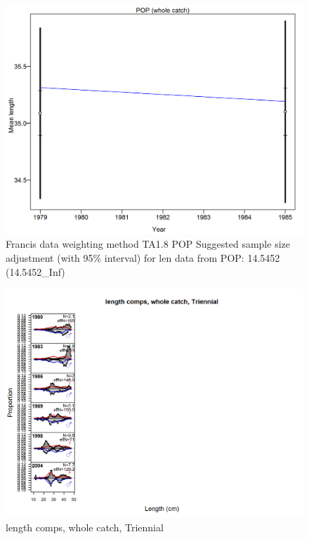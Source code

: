 \documentclass[12pt,]{article}
\begin{document}
\begin{figure}
\centering
\includegraphics{./r4ss/plots_mod1/comp_lenfit_data_weighting_TA1.8_POP.png}
\caption{Francis data weighting method TA1.8 POP Suggested sample size
adjustment (with 95\% interval) for len data from POP: 14.5452
(14.5452\_Inf) \label{fig:mod1_17_comp_lenfit_data_weighting_TA1.8_POP}}
\end{figure}

\begin{figure}
\centering
\includegraphics{./r4ss/plots_mod1/comp_lenfit_flt5mkt0.png}
\caption{length comps, whole catch, Triennial
\label{fig:mod1_18_comp_lenfit_flt5mkt0}}
\end{figure}
\end{document}
